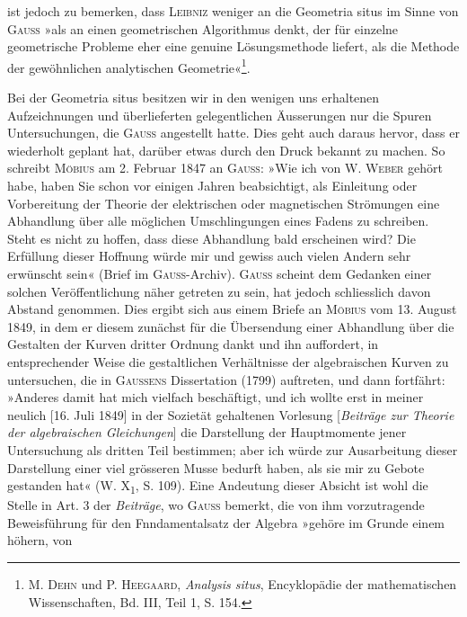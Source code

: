 ist jedoch zu bemerken, dass \textsc{Leibniz} weniger an die Geometria situs im Sinne
von \textsc{Gauss} »als an einen geometrischen Algorithmus denkt, der für einzelne
geometrische Probleme eher eine genuine Lösungsmethode liefert, als die Methode
der gewöhnlichen analytischen Geometrie«\footnote{M. \textsc{Dehn} und P. \textsc{Heegaard}, \textit{Analysis situs}, Encyklopädie der mathematischen Wissenschaften, Bd. III, Teil 1, S. 154.}.
\par
Bei der Geometria situs besitzen wir in den wenigen uns erhaltenen Aufzeichnungen
und überlieferten gelegentlichen Äusserungen nur die Spuren
 Untersuchungen, die \textsc{Gauss} angestellt hatte. Dies geht auch
daraus hervor, dass er wiederholt geplant hat, darüber etwas durch den Druck
bekannt zu machen. So schreibt \textsc{Möbius} am 2. Februar 1847 an \textsc{Gauss}: »Wie
ich von W. \textsc{Weber} gehört habe, haben Sie schon vor einigen Jahren beabsichtigt,
als Einleitung oder Vorbereitung der Theorie der elektrischen oder
\clearpage{}\setcounter{footnote}{0}
\noindent magnetischen Strömungen eine Abhandlung über alle möglichen Umschlingungen
eines Fadens zu schreiben. Steht es nicht zu hoffen, dass diese Abhandlung
bald erscheinen wird? Die Erfüllung dieser Hoffnung würde mir und gewiss
auch vielen Andern sehr erwünscht sein« (Brief im \textsc{Gauss}-Archiv). \textsc{Gauss}
scheint dem Gedanken einer solchen Veröffentlichung näher getreten zu sein,
hat jedoch schliesslich davon Abstand genommen. Dies ergibt sich aus einem
Briefe an \textsc{Möbius} vom 13. August 1849, in dem er diesem zunächst für die
Übersendung einer Abhandlung über die Gestalten der Kurven dritter Ordnung
dankt und ihn auffordert, in entsprechender Weise die gestaltlichen Verhältnisse
der algebraischen Kurven zu untersuchen, die in \textsc{Gaussens} Dissertation
(1799) auftreten, und dann fortfährt: »Anderes damit  hat
mich vielfach beschäftigt, und ich wollte erst in meiner neulich [16. Juli 1849]
in der Sozietät gehaltenen Vorlesung [\textit{Beiträge zur Theorie der algebraischen
Gleichungen}] die Darstellung der Hauptmomente jener Untersuchung als dritten
Teil bestimmen; aber ich würde zur Ausarbeitung dieser Darstellung einer
viel grösseren Musse bedurft haben, als sie mir zu Gebote gestanden hat«
(W. X\textsubscript{1}, S. 109). Eine Andeutung dieser Absicht ist wohl die Stelle in Art. 3
der \textit{Beiträge}, wo \textsc{Gauss} bemerkt, die von ihm vorzutragende Beweisführung
für den Fnndamentalsatz der Algebra »gehöre im Grunde einem höhern, von
